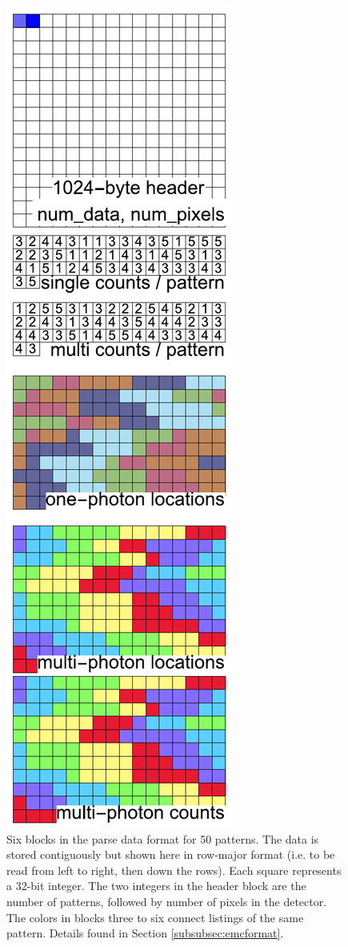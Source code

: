 \documentclass[]{iucr}              %
\begin{document}
\begin{figure}
\caption{Six blocks in the parse data format for 50 patterns. The data is stored contiguously but shown here in row-major format (i.e. to be read from left to right, then down the rows). Each square represents a 32-bit integer. The two integers in the header block are the number of patterns, followed by number of pixels in the detector. The colors in blocks three to six connect listings of the same pattern. Details found in Section \ref{subsubsec:emcformat}.}\label{fig:dataFormat}
\includegraphics[height=0.8\textheight]{figures/dataFormat}
\end{figure}
\end{document}
